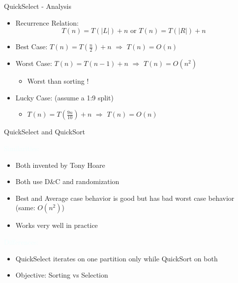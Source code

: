 \documentclass{beamer}
\newcommand{\tblue}[1]{{\Large {\textcolor{azure}{#1}}}}
\begin{document}
\begin{frame}{QuickSelect - Analysis}
\begin{itemize}
    \item Recurrence Relation: \pause $$T(n) = T(|L|) + n \text{ or } T(n) = T(|R|) + n$$ 
    \item Best Case: \pause $T(n) = T(\frac{n}{2}) + n$ $\Rightarrow$ $T(n) = O(n)$
    \item Worst Case: \pause $T(n) = T(n-1) + n$ $\Rightarrow$ $T(n) = O(n^2)$
    \begin{itemize}
        \item Worst than sorting !
    \end{itemize}
    \item Lucky Case: (assume a 1:9 split) \pause
    \begin{itemize}
        \item $T(n) = T(\frac{9n}{10}) + n$ $\Rightarrow$ $T(n) = O(n)$
    \end{itemize}
\end{itemize}
\end{frame}



\begin{frame}{QuickSelect and QuickSort}

\tblue{Similarities:}
\pause
\begin{itemize}
    \item Both invented by Tony Hoare 
    \item Both use D\&C and randomization
    \item Best and Average case behavior is good but has bad worst case behavior (same: $O(n^2)$)
    \item Works very well in practice
\end{itemize}

\tblue{Differences:}
\pause
\begin{itemize}
    \item QuickSelect iterates on one partition only while QuickSort on both
    \item Objective: Sorting vs Selection
\end{itemize}
\end{frame}
\end{document}
